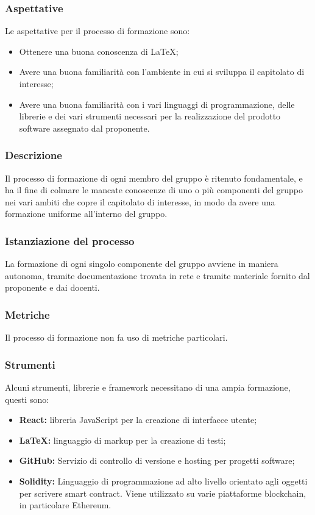 \subsubsection {Aspettative}
Le aspettative per il processo di formazione sono:
\begin {itemize}
\item Ottenere una buona conoscenza di \LaTeX{};
\item Avere una buona familiarità con l'ambiente in cui si sviluppa il capitolato di interesse;
\item Avere una buona familiarità con i vari linguaggi di programmazione, delle librerie e dei vari strumenti necessari per la realizzazione del prodotto software assegnato dal proponente.
\end {itemize}
\subsubsection {Descrizione}
Il processo di formazione di ogni membro del gruppo \groupName{} è ritenuto fondamentale, e ha il fine di colmare le mancate conoscenze di uno o più componenti del gruppo nei vari ambiti che copre il capitolato di interesse, in modo da avere una formazione uniforme all'interno del gruppo.
\subsubsection{Istanziazione del processo}
La formazione di ogni singolo componente del gruppo avviene in maniera autonoma, tramite documentazione trovata in rete e tramite materiale fornito dal proponente e dai docenti.

\subsubsection{Metriche}
Il processo di formazione non fa uso di metriche particolari.
\subsubsection{Strumenti}
Alcuni strumenti, librerie e framework necessitano di una ampia formazione, questi sono: 

\begin{itemize}
  \item \textbf{React:} libreria JavaScript\glo{} per la creazione di interfacce utente;
  \item \textbf{\LaTeX:} linguaggio di markup per la creazione di testi;
  \item \textbf{GitHub:} Servizio di controllo di versione e hosting per progetti software;
  \item \textbf{Solidity:} Linguaggio di programmazione ad alto livello orientato agli oggetti per scrivere smart contract\glo{}.
  Viene utilizzato su varie piattaforme blockchain\glo{}, in particolare Ethereum\glo{}.

\end{itemize} 